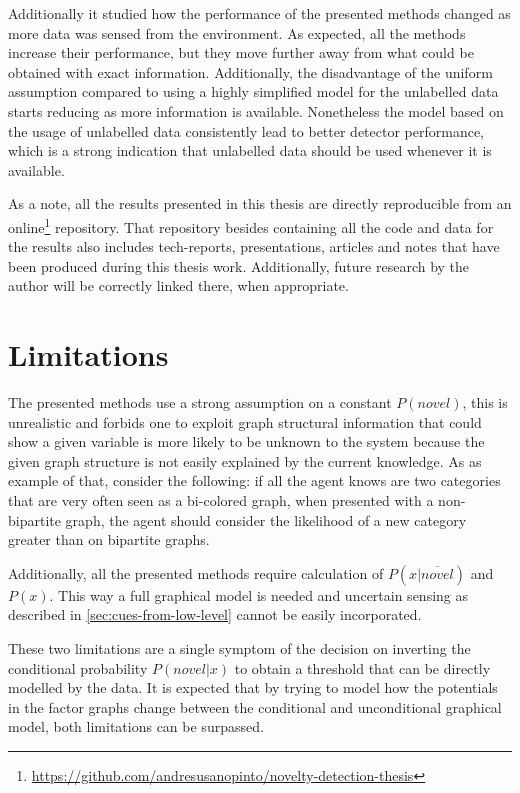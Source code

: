 Additionally it studied how the performance of the presented methods changed as more data
was sensed from the environment. As expected, all the methods increase their performance, but they
move further away from what could be obtained with exact information.
Additionally, the disadvantage of the uniform assumption compared to using a highly simplified
model for the unlabelled data starts reducing as more information is available.
Nonetheless the model based on the usage of unlabelled data consistently lead to better detector
performance, which is a strong indication that unlabelled data should be used whenever it is available.

As a note, all the results presented in this thesis are directly reproducible from an
online\footnote{\url{https://github.com/andresusanopinto/novelty-detection-thesis}}
repository. That repository besides containing all the code and data for the results also
includes tech-reports, presentations, articles and notes that have been produced during
this thesis work. Additionally, future research by the author will be correctly linked there,
when appropriate.


\section{Limitations}

The presented methods use a strong assumption on a constant $P(novel)$, this is unrealistic and
forbids one to exploit graph structural information that could show a given variable is more likely
to be unknown to the system because the given graph structure is not easily explained by the
current knowledge. As as example of that, consider the following: if all the agent knows are two 
categories that are very often seen as a bi-colored graph, when presented with a non-bipartite graph, 
the agent should consider the likelihood of a new category greater than on bipartite graphs.

Additionally, all the presented methods require calculation of $P(x|\overline{novel})$ and
$P(x)$. This way a full graphical model is needed and uncertain sensing as described in
\autoref{sec:cues-from-low-level} cannot be easily incorporated.

These two limitations are a single symptom of the decision on inverting the conditional probability
$P(novel|x)$ to obtain a threshold that can be directly modelled by the data.
It is expected that by trying to model how the potentials in the factor graphs change between the
conditional and unconditional graphical model, both limitations can be surpassed.


